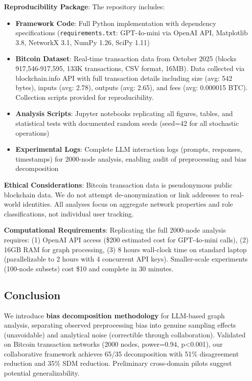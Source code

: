 \documentclass[conference]{IEEEtran}
\begin{document}
\textbf{Reproducibility Package}: The repository includes:
\begin{itemize}
    \item \textbf{Framework Code}: Full Python implementation with dependency specifications (\texttt{requirements.txt}: GPT-4o-mini via OpenAI API, Matplotlib 3.8, NetworkX 3.1, NumPy 1.26, SciPy 1.11)
    \item \textbf{Bitcoin Dataset}: Real-time transaction data from October 2025 (blocks 917,546-917,595, 133K transactions, CSV format, 16MB). Data collected via blockchain.info API with full transaction details including size (avg: 542 bytes), inputs (avg: 2.78), outputs (avg: 2.65), and fees (avg: 0.000015 BTC). Collection scripts provided for reproducibility.
    \item \textbf{Analysis Scripts}: Jupyter notebooks replicating all figures, tables, and statistical tests with documented random seeds (seed=42 for all stochastic operations)
    \item \textbf{Experimental Logs}: Complete LLM interaction logs (prompts, responses, timestamps) for 2000-node analysis, enabling audit of preprocessing and bias decomposition
\end{itemize}

\textbf{Ethical Considerations}: Bitcoin transaction data is pseudonymous public blockchain data. We do not attempt de-anonymization or link addresses to real-world identities. All analyses focus on aggregate network properties and role classifications, not individual user tracking.

\textbf{Computational Requirements}: Replicating the full 2000-node analysis requires: (1) OpenAI API access (\$200 estimated cost for GPT-4o-mini calls), (2) 16GB RAM for graph processing, (3) 8 hours wall-clock time on standard laptop (parallelizable to 2 hours with 4 concurrent API keys). Smaller-scale experiments (100-node subsets) cost \$10 and complete in 30 minutes.

\subsection{Conclusion}

We introduce \textbf{bias decomposition methodology} for LLM-based graph analysis, separating observed preprocessing bias into genuine sampling effects (unavoidable) and analytical noise (correctible through collaboration). Validated on Bitcoin transaction networks (2000 nodes, power=0.94, p<0.001), our collaborative framework achieves 65/35 decomposition with 51\% disagreement reduction and 35\% SDM reduction. Preliminary cross-domain pilots suggest potential generalizability.
\end{document}
